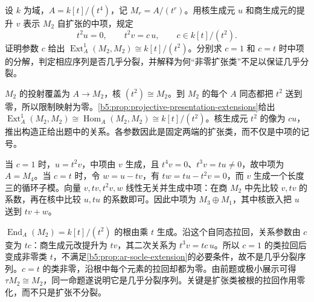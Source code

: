 \begin{optionalexercise}\label{b5:ex:10-nonzero-not-almost-split}
	设 \(k\) 为域，\(A=k[t]/(t^4)\)，记 \(M_r=A/(t^r)\)。用核生成元 \(u\) 和商生成元的提升 \(v\) 表示 \(M_2\) 自扩张的中项，规定
	\[
		t^2u=0,\qquad t^2v=c\,u,\qquad c\in k[t]/(t^2).
	\]
	证明参数 \(c\) 给出 \(\operatorname{Ext}_A^1(M_2,M_2)\cong k[t]/(t^2)\)。分别求 \(c=1\) 和 \(c=t\) 时中项的分解，判定相应序列是否几乎分裂，并解释为何“非零扩张类”不足以保证几乎分裂。
\end{optionalexercise}
\begin{solution}
	\(M_2\) 的投射覆盖为 \(A\to M_2\)，核 \((t^2)\cong M_2\)。到 \(M_2\) 的每个 \(A\) 同态都把 \(t^2\) 送到零，所以限制映射为零。\cref{b5:prop:projective-presentation-extensions}给出 \(\operatorname{Ext}_A^1(M_2,M_2)\cong\operatorname{Hom}_A(M_2,M_2)\cong k[t]/(t^2)\)。核生成元 \(t^2\) 的像为 \(cu\)，推出构造正给出题中的关系。各参数因此是固定两端的扩张类，而不仅是中项的记号。

	当 \(c=1\) 时，\(u=t^2v\)，中项由 \(v\) 生成，且 \(t^4v=0\)、\(t^3v=tu\ne0\)，故中项为 \(A=M_4\)。当 \(c=t\) 时，令 \(w=u-tv\)，有 \(tw=tu-t^2v=0\)，而 \(v\) 生成一个长度三的循环子模。向量 \(v,tv,t^2v,w\) 线性无关并生成中项：在商 \(M_2\) 中先比较 \(v,tv\) 的系数，再在核中比较 \(u,tu\) 的系数即可。因此中项为 \(M_3\oplus M_1\)，其中核嵌入把 \(u\) 送到 \(tv+w\)。

	\(\operatorname{End}_A(M_2)=k[t]/(t^2)\) 的根由乘 \(t\) 生成。沿这个自同态拉回，关系参数由 \(c\) 变为 \(tc\)：商生成元改提升为 \(tv\)，其二次关系为 \(t^3v=tc\,u\)。所以 \(c=1\) 的类拉回后变成非零类 \(t\)，不满足\cref{b5:prop:ar-socle-extension}的必要条件，故不是几乎分裂序列。\(c=t\) 的类非零，沿根中每个元素的拉回却都为零。由前题或极小展示可得 \(\tau M_2\cong M_2\)，同一命题遂说明它是几乎分裂序列。关键是扩张类被根的拉回作用零化，而不只是扩张不分裂。
\end{solution}

